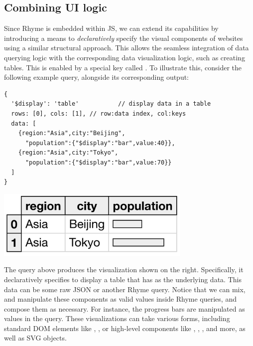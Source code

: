 \documentclass[runningheads]{llncs}
\newcommand{\lang}{Rhyme}
\begin{document}
\subsection{Combining UI logic}
Since \lang{} is embedded within JS, we can extend its capabilities by introducing
a means to \emph{declaratively} specify the visual components of websites using a similar
structural approach.
This allows the seamless integration of data querying logic with the corresponding
data visualization logic, such as creating tables.
This is enabled by a special key called .
To illustrate this, consider the following example query, alongside its corresponding output:

\hspace{-18pt}
\begin{minipage}{0.6\textwidth}
\begin{lstlisting}[style=JavaScript,columns=flexible]
{
  '$display': 'table'           // display data in a table
  rows: [0], cols: [1], // row:data index, col:keys
  data: [
    {region:"Asia",city:"Beijing",
      "population":{"$display":"bar",value:40}},
    {region:"Asia",city:"Tokyo",
      "population":{"$display":"bar",value:70}}
  ]
}
\end{lstlisting}
\end{minipage}%
\begin{minipage}{0.4\textwidth}
\includegraphics[width=0.7\textwidth]{images/small_table.png}
\end{minipage}

The query above produces the visualization shown on the right.
Specifically, it declaratively specifies to display a table that
has  as the underlying data.
This data can be some raw JSON or another \lang{} query.
Notice that we can mix, and manipulate these components as valid
values inside \lang{} queries, and compose them as necessary.
For instance, the progress bars are manipulated as values in the query.
These visualizations can take various forms, including standard DOM elements
like , , or high-level components like
, , , and more,
as well as SVG objects.
\end{document}
